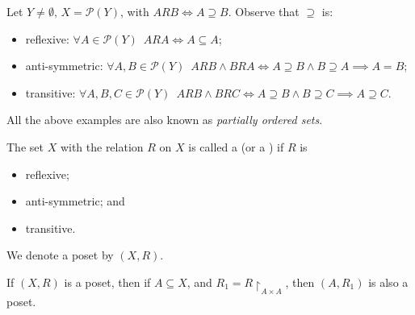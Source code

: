 \documentclass[notoc,notitlepage]{tufte-book}
\begin{document}
\begin{eg}
  Let $Y \neq \emptyset, \, X = \mathcal{P}(Y)$, with $ARB \iff A \supseteq B$. Observe that $\supseteq$ is:
  \begin{itemize}
    \item reflexive: $\forall A \in \mathcal{P}(Y) \enspace ARA \iff A \subseteq A$;
    \item anti-symmetric: $\forall A, B \in \mathcal{P}(Y) \enspace ARB \land BRA \iff A \supseteq B \land B \supseteq A \implies A = B$;
    \item transitive: $\forall A, B, C \in \mathcal{P}(Y) \enspace ARB \land BRC \iff A \supseteq B \land B \supseteq C \implies A \supseteq C$.
  \end{itemize}
\end{eg}

All the above examples are also known as \textit{partially ordered sets}.

\begin{defn}
\label{defn:partially_ordered_sets}
The set $X$ with the relation $R$ on $X$ is called a  (or a ) if $R$ is
  \begin{itemize}
    \item reflexive;
    \item anti-symmetric; and
    \item transitive.
  \end{itemize}
  We denote a poset by $(X, R)$.
\end{defn}

\begin{note}
  If $(X, R)$ is a poset, then if $A \subseteq X$, and $R_1 = R \restriction_{A \times A}$, then $(A, R_1)$ is also a poset.
\end{note}
\end{document}
